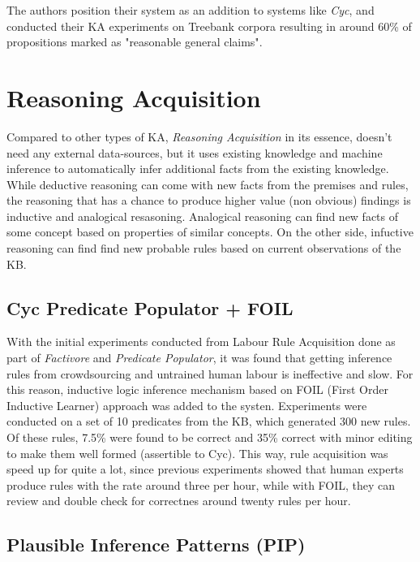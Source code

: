 The authors position their system as an addition to systems like \emph{Cyc}, and
conducted their KA experiments on Treebank corpora resulting in around 60\% of
propositions marked as "reasonable general claims"\parencite{Schubert2003}. 

\section{Reasoning Acquisition}
Compared to other types of KA, \emph{Reasoning Acquisition} in its essence,
doesn't need any external data-sources, but it uses existing knowledge and
machine inference to automatically infer additional facts from the existing
knowledge. While deductive reasoning can come with new facts from the premises 
and rules, the reasoning that has a chance to produce higher value (non obvious)
findings is inductive and analogical resasoning. Analogical reasoning can find
new facts of some concept based on properties of similar concepts. On the other
side, infuctive reasoning can find find new probable rules based on current 
observations of the KB.

\subsection {Cyc Predicate Populator + FOIL}
With the initial experiments conducted from Labour Rule Acquisition done as part
of \emph{Factivore} and \emph{Predicate Populator}\parencite{Witbrock2005}, it 
was found that getting inference rules from crowdsourcing and untrained
human labour is ineffective and slow. For this reason, inductive logic 
inference mechanism based on FOIL (First Order Inductive Learner) approach
\parencite{Quinlan1995} was added to the systen. Experiments were conducted on
a set of 10 predicates from the KB, which generated 300 new rules. Of these
rules, 7.5\% were found to be correct and 35\% correct with minor editing to
make them well formed (assertible to Cyc). This way, rule acquisition was speed
up for quite a lot, since previous experiments showed that human experts produce
rules with the rate around three per hour, while with FOIL, they can review
and double check for correctnes around twenty rules per hour.

\subsection {Plausible Inference Patterns (PIP)}

